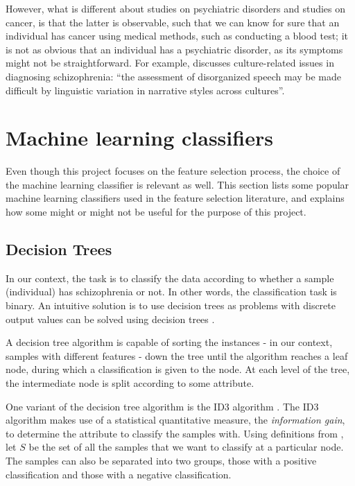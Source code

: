 \documentclass[12pt, twoside, a4paper]{report}
\begin{document}
However, what is different about studies on psychiatric disorders and studies on cancer, is that the latter is observable, such that we can know for sure that an individual has cancer using medical methods, such as conducting a blood test; it is not as obvious that an individual has a psychiatric disorder, as its symptoms might not be straightforward. For example, \cite{RefWorks:114} discusses culture-related issues in diagnosing schizophrenia: ``the assessment of disorganized speech may be made difficult by linguistic variation in narrative styles across cultures''.



\section{Machine learning classifiers} \label{bg_ML}
Even though this project focuses on the feature selection process, the choice of the machine learning classifier is relevant as well. This section lists some popular machine learning classifiers used in the feature selection literature, and explains how some might or might not be useful for the purpose of this project.

\subsection{Decision Trees} \label{bg:ml:decisionTree}
In our context, the task is to classify the data according to whether a sample (individual) has schizophrenia or not. In other words, the classification task is binary. An intuitive solution is to use decision trees as problems with discrete output values can be solved using decision trees \cite{RefWorks:98}.

A decision tree algorithm is capable of sorting the  instances - in our context, samples with different features - down the tree until the algorithm reaches a leaf node, during which a classification is given to the node. At each level of the tree, the intermediate node is split according to some attribute.

One variant of the decision tree algorithm is the ID3 algorithm \cite{RefWorks:99}. The ID3 algorithm makes use of a statistical quantitative measure, the \textit{information gain}, to determine the attribute to classify the samples with. Using definitions from \cite{RefWorks:98}, let $S$ be the set of all the samples that we want to classify at a particular node. The samples can also be separated into two groups, those with a positive classification and those with a negative classification.\\
\end{document}
